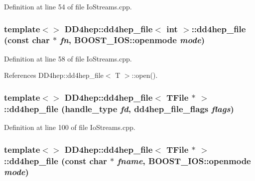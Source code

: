 Definition at line 54 of file IoStreams.cpp.\hypertarget{class_d_d4hep_1_1dd4hep__file_a303f6f139aa0876bbc6dc781715a95e2}{
\subsubsection[{dd4hep\_\-file}]{\setlength{\rightskip}{0pt plus 5cm}template$<$$>$ {\bf DD4hep::dd4hep\_\-file}$<$ int $>$::{\bf dd4hep\_\-file} (const char $\ast$ {\em fn}, \/  BOOST\_\-IOS::openmode {\em mode})}}
\label{class_d_d4hep_1_1dd4hep__file_a303f6f139aa0876bbc6dc781715a95e2}


Definition at line 58 of file IoStreams.cpp.

References DD4hep::dd4hep\_\-file$<$ T $>$::open().\hypertarget{class_d_d4hep_1_1dd4hep__file_a8e16cedfefc87907ac964b73fbe59952}{
\subsubsection[{dd4hep\_\-file}]{\setlength{\rightskip}{0pt plus 5cm}template$<$$>$ {\bf DD4hep::dd4hep\_\-file}$<$ TFile $\ast$ $>$::{\bf dd4hep\_\-file} ({\bf handle\_\-type} {\em fd}, \/  {\bf dd4hep\_\-file\_\-flags} {\em flags})}}
\label{class_d_d4hep_1_1dd4hep__file_a8e16cedfefc87907ac964b73fbe59952}


Definition at line 100 of file IoStreams.cpp.\hypertarget{class_d_d4hep_1_1dd4hep__file_a8af2b1baf80935d2a9b34704c49e51d8}{
\subsubsection[{dd4hep\_\-file}]{\setlength{\rightskip}{0pt plus 5cm}template$<$$>$ {\bf DD4hep::dd4hep\_\-file}$<$ TFile $\ast$ $>$::{\bf dd4hep\_\-file} (const char $\ast$ {\em fname}, \/  BOOST\_\-IOS::openmode {\em mode})}}
\label{class_d_d4hep_1_1dd4hep__file_a8af2b1baf80935d2a9b34704c49e51d8}


